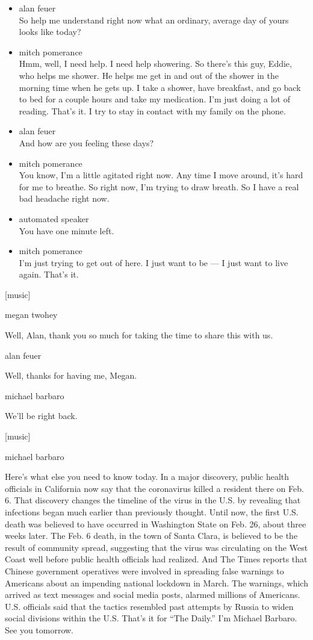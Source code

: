 \begin{itemize}
\item
  alan feuer\\
  So help me understand right now what an ordinary, average day of yours
  looks like today?
\item
  mitch pomerance\\
  Hmm, well, I need help. I need help showering. So there's this guy,
  Eddie, who helps me shower. He helps me get in and out of the shower
  in the morning time when he gets up. I take a shower, have breakfast,
  and go back to bed for a couple hours and take my medication. I'm just
  doing a lot of reading. That's it. I try to stay in contact with my
  family on the phone.
\item
  alan feuer\\
  And how are you feeling these days?
\item
  mitch pomerance\\
  You know, I'm a little agitated right now. Any time I move around,
  it's hard for me to breathe. So right now, I'm trying to draw breath.
  So I have a real bad headache right now.
\item
  automated speaker\\
  You have one minute left.
\item
  mitch pomerance\\
  I'm just trying to get out of here. I just want to be --- I just want
  to live again. That's it.
\end{itemize}

{[}music{]}

megan twohey

Well, Alan, thank you so much for taking the time to share this with us.

alan feuer

Well, thanks for having me, Megan.

michael barbaro

We'll be right back.

{[}music{]}

michael barbaro

Here's what else you need to know today. In a major discovery, public
health officials in California now say that the coronavirus killed a
resident there on Feb. 6. That discovery changes the timeline of the
virus in the U.S. by revealing that infections began much earlier than
previously thought. Until now, the first U.S. death was believed to have
occurred in Washington State on Feb. 26, about three weeks later. The
Feb. 6 death, in the town of Santa Clara, is believed to be the result
of community spread, suggesting that the virus was circulating on the
West Coast well before public health officials had realized. And The
Times reports that Chinese government operatives were involved in
spreading false warnings to Americans about an impending national
lockdown in March. The warnings, which arrived as text messages and
social media posts, alarmed millions of Americans. U.S. officials said
that the tactics resembled past attempts by Russia to widen social
divisions within the U.S. That's it for ``The Daily.'' I'm Michael
Barbaro. See you tomorrow.

